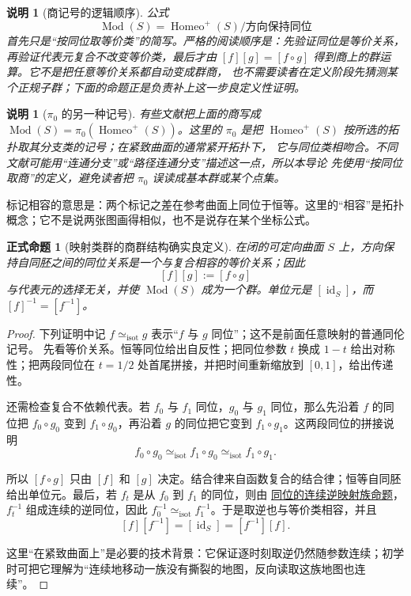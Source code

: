\documentclass[UTF8,fontset=none,a4paper,11pt]{ctexart}
\theoremstyle{foundation-definition}
\theoremstyle{foundation-theorem}
\theoremstyle{foundation-proposition}
\newtheorem{proposition}[definition]{正式命题}
\theoremstyle{foundation-example}
\theoremstyle{foundation-remark}
\newtheorem{remark}[definition]{说明}
\theoremstyle{foundation-theorem}
\newcommand{\Mod}{\operatorname{Mod}}
\newcommand{\term}[2]{\hyperref[#1]{#2}}
\begin{document}
\begin{remark}[商记号的逻辑顺序]\label{rem:mapping-class-quotient-order}
公式
\[
\Mod(S)=\operatorname{Homeo}^{+}(S)/\text{方向保持同位}
\]
首先只是“按同位取等价类”的简写。严格的阅读顺序是：先验证同位是等价关系，
再验证代表元复合不改变等价类，最后才由
\([f][g]=[f\circ g]\) 得到商上的群运算。它不是把任意等价关系都自动变成群商，
也不需要读者在定义阶段先猜测某个正规子群；下面的命题正是负责补上这一步良定义性证明。
\end{remark}

\begin{remark}[\(\pi_0\) 的另一种记号]\label{rem:mapping-class-pi0}
有些文献把上面的商写成
\(\Mod(S)=\pi_0(\operatorname{Homeo}^{+}(S))\)。这里的 \(\pi_0\) 是把
\(\operatorname{Homeo}^{+}(S)\) 按所选的拓扑取其分支类的记号；在紧致曲面的通常紧开拓扑下，
它与同位类相吻合。不同文献可能用“连通分支”或“路径连通分支”描述这一点，所以本导论
先使用“按同位取商”的定义，避免读者把 \(\pi_0\) 误读成基本群或某个点集。
\end{remark}

标记相容的意思是：两个标记之差在参考曲面上同位于恒等。这里的“相容”是拓扑概念；它不是说两张图画得相似，也不是说存在某个坐标公式。

\thispagestyle{fancy}
\begin{proposition}[映射类群的商群结构确实良定义]\label{prop:mapping-class-group-well-defined}
在闭的可定向曲面 \(S\) 上，方向保持自同胚之间的同位关系是一个与复合相容的等价关系；因此
\[
 [f][g]:=[f\circ g]
\]
与代表元的选择无关，并使 \(\Mod(S)\) 成为一个群。单位元是 \([\operatorname{id}_S]\)，而
\([f]^{-1}=[f^{-1}]\)。
\end{proposition}

\begin{proof}
下列证明中记 \(f\simeq_{\mathrm{isot}}g\) 表示“\(f\) 与 \(g\) 同位”；这不是前面任意映射的普通同伦记号。
先看等价关系。恒等同位给出自反性；把同位参数 \(t\) 换成 \(1-t\) 给出对称性；把两段同位在 \(t=1/2\) 处首尾拼接，并把时间重新缩放到 \([0,1]\)，给出传递性。

还需检查复合不依赖代表。若 \(f_0\) 与 \(f_1\) 同位，\(g_0\) 与 \(g_1\) 同位，那么先沿着 \(f\) 的同位把
\(f_0\circ g_0\) 变到 \(f_1\circ g_0\)，再沿着 \(g\) 的同位把它变到
\(f_1\circ g_1\)。这两段同位的拼接说明
\[
 f_0\circ g_0\simeq_{\mathrm{isot}} f_1\circ g_0\simeq_{\mathrm{isot}} f_1\circ g_1.
\]

所以 \([f\circ g]\) 只由 \([f]\) 和 \([g]\) 决定。结合律来自函数复合的结合律；恒等自同胚给出单位元。最后，若 \(f_t\) 是从 \(f_0\) 到 \(f_1\) 的同位，则由
\term{prop:isotopy-inverse-family}{同位的连续逆映射族命题}，\(f_t^{-1}\) 组成连续的逆同位，因此 \(f_0^{-1}\simeq_{\mathrm{isot}} f_1^{-1}\)。于是取逆也与等价类相容，并且
\[
 [f][f^{-1}]=[\operatorname{id}_S]=[f^{-1}][f].
\]

这里“在紧致曲面上”是必要的技术背景：它保证逐时刻取逆仍然随参数连续；初学时可把它理解为“连续地移动一族没有撕裂的地图，反向读取这族地图也连续”。
\end{proof}
\end{document}
